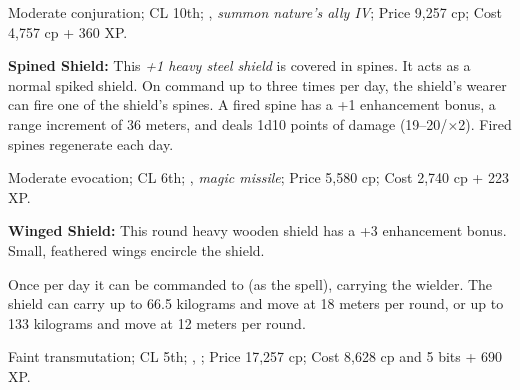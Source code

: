 Moderate conjuration; CL 10th; , \emph{summon nature's ally IV}; Price 9,257 cp; Cost 4,757 cp + 360 XP.

\textbf{Spined Shield:} This \emph{+1 heavy steel shield} is covered in spines. It acts as a normal spiked shield. On command up to three times per day, the shield's wearer can fire one of the shield's spines. A fired spine has a +1 enhancement bonus, a range increment of 36 meters, and deals 1d10 points of damage (19--20/$\times$2). Fired spines regenerate each day.

Moderate evocation; CL 6th; , \emph{magic missile}; Price 5,580 cp; Cost 2,740 cp + 223 XP.

\textbf{Winged Shield:} This round heavy wooden shield has a +3 enhancement bonus. Small, feathered wings encircle the shield.

Once per day it can be commanded to  (as the spell), carrying the wielder. The shield can carry up to 66.5 kilograms and move at 18 meters per round, or up to 133 kilograms and move at 12 meters per round.

Faint transmutation; CL 5th; , ; Price 17,257 cp; Cost 8,628 cp and 5 bits + 690 XP.
